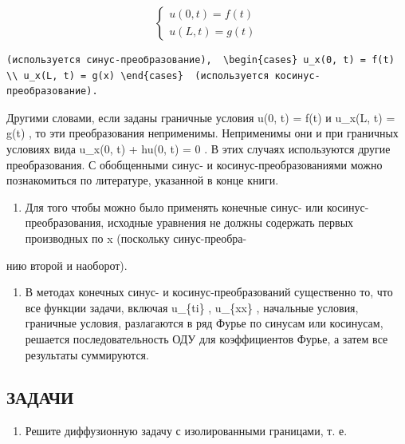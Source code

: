 \documentclass[
  ukrainian,
]{article}
\providecommand{\tightlist}{%
  \setlength{\itemsep}{0pt}\setlength{\parskip}{0pt}}
\begin{document}
\[
\begin{cases} u(0, t) = f(t) \\ u(L, t) = g(t) \end{cases}
\]

\begin{verbatim}
(используется синус-преобразование),  \begin{cases} u_x(0, t) = f(t) \\ u_x(L, t) = g(x) \end{cases}  (используется косинус-преобразование).
\end{verbatim}

Другими словами, если заданы граничные условия u(0, t) = f(t) и u\_x(L,
t) = g(t) , то эти преобразования неприменимы. Неприменимы они и при
граничных условиях вида u\_x(0, t) + hu(0, t) = 0 . В этих случаях
используются другие преобразования. С обобщенными синус- и
косинус-преобразованиями можно познакомиться по литературе, указанной в
конце книги.

\begin{enumerate}
\def\labelenumi{\arabic{enumi}.}
\setcounter{enumi}{1}
\tightlist
\item
  Для того чтобы можно было применять конечные синус- или
  косинус-преобразования, исходные уравнения не должны содержать первых
  производных по x (поскольку синус-преобра-
\end{enumerate}

нию второй и наоборот).

\begin{enumerate}
\def\labelenumi{\arabic{enumi}.}
\setcounter{enumi}{2}
\tightlist
\item
  В методах конечных синус- и косинус-преобразований существенно то, что
  все функции задачи, включая u\_\{ti\} , u\_\{xx\} , начальные условия,
  граничные условия, разлагаются в ряд Фурье по синусам или косинусам,
  решается последовательность ОДУ для коэффициентов Фурье, а затем все
  результаты суммируются.
\end{enumerate}

\subsection{ЗАДАЧИ}\label{ux437ux430ux434ux430ux447ux438-4}

\begin{enumerate}
\def\labelenumi{\arabic{enumi}.}
\tightlist
\item
  Решите диффузионную задачу с изолированными границами, т. е.
\end{enumerate}
\end{document}
